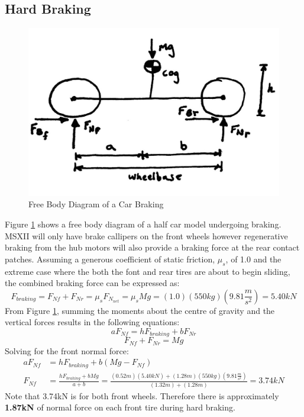 \documentclass[12pt]{article}
\begin{document}
\subsection{Hard Braking}
\label{sec:hardBraking}
\begin{figure}[h!]
	\centering
	\includegraphics[width=.5\textwidth]{./LaTex/brakingFBD.jpg}
	\caption{Free Body Diagram of a Car Braking}
	\label{fig:barkingFBD}
\end{figure}
Figure \ref{fig:barkingFBD} shows a free body diagram of a half car model undergoing braking. MSXII will only have brake callipers on the front wheels however regenerative braking from the hub motors will also provide a braking force at the rear contact patches. Assuming a generous coefficient of static friction, $\mu _s$, of 1.0 and the extreme case where the both the font and rear tires are about to begin sliding, the combined braking force can be expressed as: 
\begin{equation}
	F_{braking} = F_{Nf} + F_{Nr} = \mu _s F_{N_{net}} =  \mu _s Mg = (1.0)(550kg)\left(9.81\frac{m}{s^2}\right) = 5.40kN
\end{equation}
From Figure \ref{fig:barkingFBD}, summing the moments about the centre of gravity and the vertical forces results in the following equations: 
\begin{equation}
	aF_{Nf} = hF_{braking} + bF_{Nr}
\end{equation}
\begin{equation}
	F_{Nf} + F_{Nr} = Mg
\end{equation}
Solving for the front normal force: 
\begin{equation}
\begin{split}
	aF_{Nf} &= hF_{braking} + b(Mg - F_{Nf})\\
	F_{Nf} &= \frac{hF_{braking} + bMg}{a+b} = \frac{(0.52m)(5.40kN)+(1.28m)(550kg)\left(9.81\frac{m}{s^2}\right)}{(1.32m)+(1.28m)} = 3.74kN
\end{split}
\end{equation}
Note that 3.74kN is for both front wheels. Therefore there is approximately \textbf{1.87kN} of normal force on each front tire during hard braking. 
\end{document}
